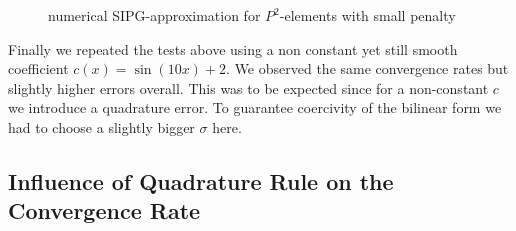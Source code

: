 \begin{figure}[h!]
\begin{minipage}[t]{0.48\textwidth}
        \caption{numerical SIPG-approximation for $P^2$-elements with small penalty}
        \label{fig:elliptic_uniform_mesh_sol_p2_non_coercive}
    \end{minipage}
\end{figure}

Finally we repeated the tests above using a non constant yet still smooth coefficient $c(x) = \sin(10x) + 2$. We observed the same convergence rates but slightly higher
errors overall. This was to be expected since for a non-constant $c$ we introduce a quadrature error. 
To guarantee coercivity of the bilinear form we had to choose a slightly bigger $\sigma$ here.

\subsection{Influence of Quadrature Rule on the Convergence Rate}


